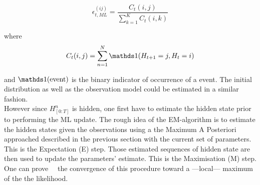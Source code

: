 \documentclass[a4paper,11pt]{report}
\begin{document}
      \begin{equation}
        \epsilon_{t,ML}^{(ij)} = \frac{C_{t}(i,j)}{\sum_{k=1}^{K}C_{t}(i,k)}
        \label{eq:EM intuit transition}
      \end{equation}
      
      where 
      \begin{equation}
        C_{t}(i,j) = \sum_{n=1}^{N} \ds1(H_{t+1}=j, H_{t}=i)
        \label{eq:EM intuit transition count}
      \end{equation}
      
      and $\ds1(\text{event})$ is the binary indicator of occurrence of a event. The initial distribution as well as the observation model could be estimated in a similar fashion.\\
      
      However since $H_{[0:T]}^{n}$ is hidden, one first have to estimate the hidden state prior to performing the ML update. The rough idea of the EM-algorithm is to estimate the hidden states given the observations using a the Maximum A Posteriori approached described in the previous section with the current set of parameters. This is the Expectation (E) step. Those estimated sequences of hidden state are then used to update the parameters' estimate. This is the Maximisation (M) step.\\
      
      One can prove~\citep{baum1970maximization}~\citep{dempster1977maximum} the convergence of this procedure toward a ---local--- maximum of the the likelihood.
      
      
\end{document}
